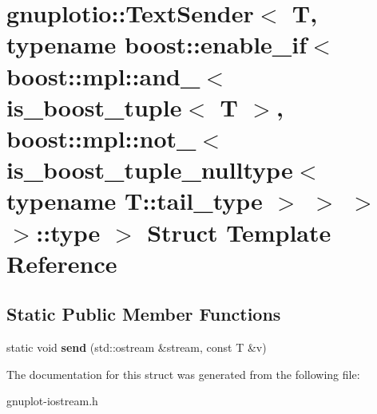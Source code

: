 \hypertarget{structgnuplotio_1_1TextSender_3_01T_00_01typename_01boost_1_1enable__if_3_01boost_1_1mpl_1_1and_613e8c35e9263a9c4b5e2b75ff99b434}{}\section{gnuplotio\+:\+:Text\+Sender$<$ T, typename boost\+:\+:enable\+\_\+if$<$ boost\+:\+:mpl\+:\+:and\+\_\+$<$ is\+\_\+boost\+\_\+tuple$<$ T $>$, boost\+:\+:mpl\+:\+:not\+\_\+$<$ is\+\_\+boost\+\_\+tuple\+\_\+nulltype$<$ typename T\+:\+:tail\+\_\+type $>$ $>$ $>$ $>$\+:\+:type $>$ Struct Template Reference}
\label{structgnuplotio_1_1TextSender_3_01T_00_01typename_01boost_1_1enable__if_3_01boost_1_1mpl_1_1and_613e8c35e9263a9c4b5e2b75ff99b434}
\subsection*{Static Public Member Functions}
\begin{DoxyCompactItemize}
\item 
\mbox{\label{structgnuplotio_1_1TextSender_3_01T_00_01typename_01boost_1_1enable__if_3_01boost_1_1mpl_1_1and_613e8c35e9263a9c4b5e2b75ff99b434_a57bf894398f70f08cd4bac18ee5cbf68}} 
static void {\bfseries send} (std\+::ostream \&stream, const T \&v)
\end{DoxyCompactItemize}


The documentation for this struct was generated from the following file\+:\begin{DoxyCompactItemize}
\item 
gnuplot-\/iostream.\+h\end{DoxyCompactItemize}
